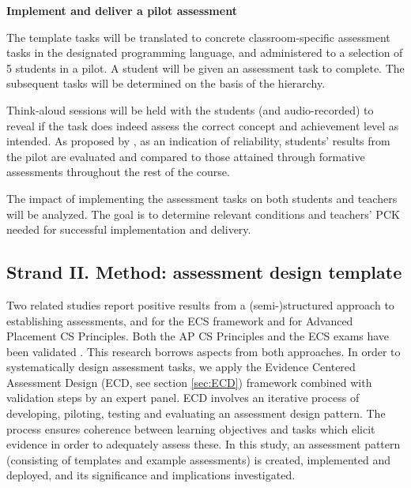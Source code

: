\noindent \textbf{Implement and deliver a pilot assessment}\newline

The template tasks will be translated to concrete classroom-specific assessment tasks in the designated programming language, and administered to a selection of 5 students in a pilot. A student will be given an assessment task to complete. The subsequent tasks will be determined on the basis of the hierarchy.

Think-aloud sessions will be held with the students (and audio-recorded) to reveal if the task does indeed assess the correct concept and achievement level as intended. As proposed by , as an indication of reliability, students' results from the pilot are evaluated and compared to those attained through formative assessments throughout the rest of the course.





%

The impact of implementing the assessment tasks on both students and teachers will be analyzed. The goal is to determine relevant conditions and teachers' PCK needed for successful implementation and delivery.


\subsection{Strand II. Method: assessment design template}
Two related studies report positive results from a (semi-)structured approach to establishing assessments,  and  for the ECS framework and  for Advanced Placement CS Principles. Both the AP CS Principles and the ECS exams have been validated \cite{2010TewGuzdial}. This research borrows aspects from both approaches. In order to systematically design assessment tasks, we apply the Evidence Centered Assessment Design (ECD, see section \ref{sec:ECD}) framework combined with validation steps by an expert panel. ECD involves an iterative process of developing, piloting, testing and evaluating an assessment design pattern. The process ensures coherence between learning objectives and tasks which elicit evidence in order to adequately assess these.  In this study, an assessment pattern (consisting of templates and example assessments) is created, implemented and deployed, and its significance and implications investigated.



